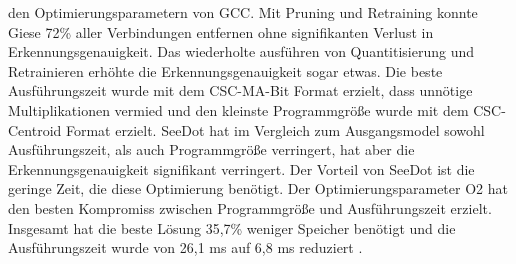 den Optimierungsparametern von GCC. Mit Pruning und Retraining konnte Giese 72\% aller Verbindungen entfernen ohne signifikanten Verlust in Erkennungsgenauigkeit. Das wiederholte ausführen von Quantitisierung und
Retrainieren erhöhte die Erkennungsgenauigkeit sogar etwas. Die beste Ausführungszeit wurde mit dem CSC-MA-Bit Format erzielt, dass unnötige Multiplikationen vermied und den kleinste Programmgröße wurde mit dem
CSC-Centroid Format erzielt. SeeDot hat im Vergleich zum Ausgangsmodel sowohl Ausführungszeit, als auch Programmgröße verringert, hat aber die Erkennungsgenauigkeit signifikant verringert. Der Vorteil von SeeDot
ist die geringe Zeit, die diese Optimierung benötigt. Der Optimierungsparameter O2 hat den besten Kompromiss zwischen Programmgröße und Ausführungszeit erzielt. Insgesamt hat die beste Lösung 35,7\% weniger Speicher
benötigt und die Ausführungszeit wurde von 26,1 ms auf 6,8 ms reduziert \cite{gieseThesis}.